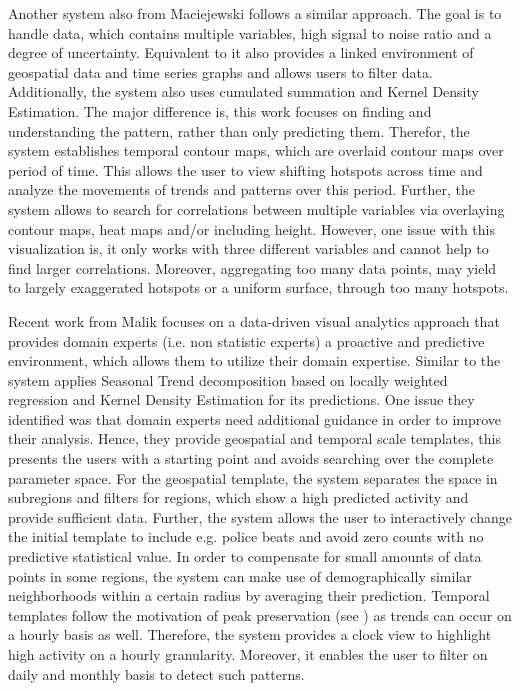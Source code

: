 \documentclass[electronic]{vgtc}             %
\begin{document}
Another system also from Maciejewski \cite{maciejewski:2010} follows a similar approach.
The goal is to handle data, which contains multiple variables, high signal to noise ratio and a degree of uncertainty.
Equivalent to \cite{maciejewski:2011} it also provides a linked environment of geospatial data and time series graphs and allows users to filter data.
Additionally, the system also uses cumulated summation and Kernel Density Estimation. 
The major difference is, this work focuses on finding and understanding the pattern, rather than only predicting them. 
Therefor, the system establishes temporal contour maps, which are overlaid contour maps over period of time. 
This allows the user to view shifting hotspots across time and analyze the movements of trends and patterns over this period.
Further, the system allows to search for correlations between multiple variables via overlaying contour maps, heat maps and/or including height. 
However, one issue with this visualization is, it only works with three different variables and cannot help to find larger correlations. 
Moreover, aggregating too many data points, may yield to largely exaggerated hotspots or a uniform surface, through too many hotspots. 

Recent work from Malik \cite{malik:2014} focuses on a data-driven visual analytics approach that provides domain experts (i.e. non statistic experts) a proactive and predictive environment, which allows them to utilize their domain expertise.
Similar to \cite{maciejewski:2011} the system applies Seasonal Trend decomposition based on locally weighted regression and Kernel Density Estimation for its predictions.
One issue they identified was that domain experts need additional guidance in order to improve their analysis. 
Hence, they provide geospatial and temporal scale templates, this presents the users with a starting point and avoids searching over the complete parameter space.
For the geospatial template, the system separates the space in subregions and filters for regions, which show a high predicted activity and provide sufficient data. 
Further, the system allows the user to interactively change the initial template to include e.g. police beats and avoid zero counts with no predictive statistical value.
In order to compensate for small amounts of data points in some regions, the system can make use of demographically similar neighborhoods within a certain radius by averaging their prediction. 
Temporal templates follow the motivation of peak preservation (see ) as trends can occur on a hourly basis as well. 
Therefore, the system provides a clock view to highlight high activity on a hourly granularity.
Moreover, it enables the user to filter on daily and monthly basis to detect such patterns.
\end{document}
